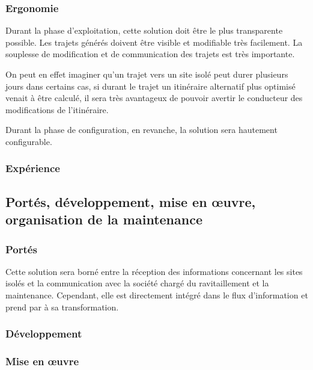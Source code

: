         \subsubsection{Ergonomie}
        
            Durant la phase d'exploitation, cette solution doit être le plus transparente possible.
            Les trajets générés doivent être visible et modifiable très facilement.
            La souplesse de modification et de communication des trajets est très importante.
            
            On peut en effet imaginer qu'un trajet vers un site isolé peut durer plusieurs jours dans certains cas, si durant le trajet un itinéraire alternatif plus optimisé venait à être calculé, il sera très avantageux de pouvoir avertir le conducteur des modifications de l'itinéraire.
            
            Durant la phase de configuration, en revanche, la solution sera hautement configurable.
        
        \subsubsection{Expérience}
    
    
    \subsection{Portés, développement, mise en œuvre, organisation de la maintenance}
    
        \subsubsection{Portés}
        
            Cette solution sera borné entre la réception des informations concernant les sites isolés et la communication avec la société chargé du ravitaillement et la maintenance.
            Cependant, elle est directement intégré dans le flux d'information et prend par à sa transformation.
            
        \subsubsection{Développement}
        
        
        \subsubsection{Mise en œuvre}
        
